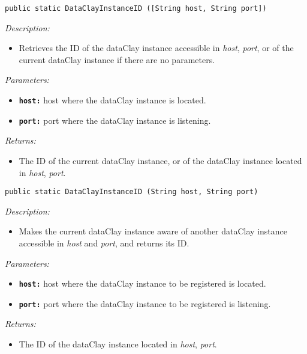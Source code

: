 \begin{dBox}
\texttt{public static DataClayInstanceID ([String host, String port])}
\LINE

{\it Description:}

\begin{itemize}
    \item Retrieves the ID of the dataClay instance accessible in \textit{host}, \textit{port}, or of the current dataClay instance if there are no parameters.
\end{itemize}

{\it Parameters:}

\begin{itemize}
  \item \texttt{\bfseries host:} host where the dataClay instance is located.
  \item \texttt{\bfseries port:} port where the dataClay instance is listening.
\end{itemize}

{\it Returns:}

\begin{itemize}
 \item The ID of the current dataClay instance, or of the dataClay instance located in \textit{host}, \textit{port}.
\end{itemize}

\end{dBox}


\begin{dBox}
\texttt{public static DataClayInstanceID (String host, String port)}
\LINE

{\it Description:}

\begin{itemize}
    \item Makes the current dataClay instance aware of another dataClay instance accessible in \textit{host} and \textit{port}, and returns its ID.
\end{itemize}

{\it Parameters:}

\begin{itemize}
  \item \texttt{\bfseries host:} host where the dataClay instance to be registered is located.
  \item \texttt{\bfseries port:} port where the dataClay instance to be registered is listening.
\end{itemize}

{\it Returns:}

\begin{itemize}
 \item The ID of the dataClay instance located in \textit{host}, \textit{port}.
\end{itemize}

\end{dBox}

